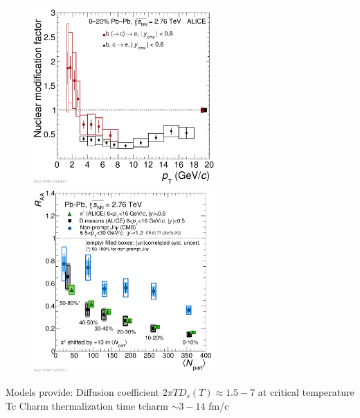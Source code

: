 \begin{figure}[!ht]
  \centering
    \includegraphics[width=7cm]{FigCap2/2017-Jan-28-rParAAbeautyincl.pdf}
    \includegraphics[width=7cm]{FigCap2/2017-May-22-RaavsNpart_Dmes8to16_Pions8to16_FinalNonPromptJpsi2017_CC_25042017.pdf}
  \caption{}
  \label{fig:}
\end{figure}


Models provide:
Diffusion coefficient 2$\pi T D_s(T) \approx 1.5-7$ at critical temperature Tc
Charm thermalization time tcharm $\sim 3-14$ fm/c


